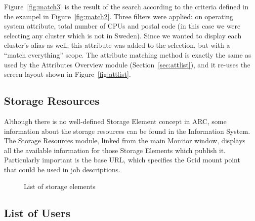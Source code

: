 \documentclass{article}
\begin{document}
Figure~\ref{fig:match3} is the result of the search according to the
criteria defined in the exampel in Figure~\ref{fig:match2}. Three
filters were applied: on operating system attribute, total number of
CPUs and postal code (in this case we were selecting any cluster which
is not in Sweden). Since we wanted to display each cluster's alias as
well, this attribute was added to the selection, but with a ``match
everything'' scope. The attribute matching method is exactly the same
as used by the Attributes Overview module (Section~\ref{sec:attlist}),
and it re-uses the screen layout shown in Figure~\ref{fig:attlist}.

\subsection{Storage Resources}
\label{sec:storage}

Although there is no well-defined Storage
Element concept in ARC, some
information about the storage resources can be found in the
Information System. The Storage Resources module, linked from the main
Monitor window, displays all the available information for those
Storage Elements which publish it. Particularly important is the base
URL, which specifies the Grid mount point that could be used in job
descriptions.

\begin{figure}[hb]
  \caption{\label{fig:storage}List of storage elements}
\end{figure}

\subsection{List of Users}
\label{sec:vo-users}
\end{document}
